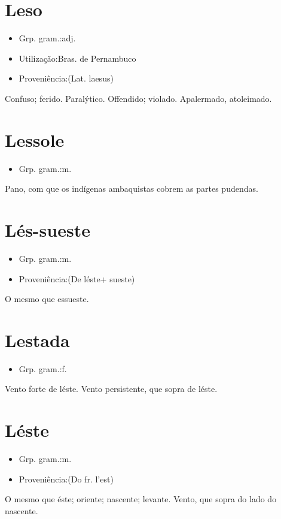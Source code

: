 \section{Leso}
\begin{itemize}
\item {Grp. gram.:adj.}
\end{itemize}
\begin{itemize}
\item {Utilização:Bras. de Pernambuco}
\end{itemize}
\begin{itemize}
\item {Proveniência:(Lat. \textunderscore laesus\textunderscore )}
\end{itemize}
Confuso; ferido.
Paralýtico.
Offendido; violado.
Apalermado, atoleimado.
\section{Lessole}
\begin{itemize}
\item {Grp. gram.:m.}
\end{itemize}
Pano, com que os indígenas ambaquistas cobrem as partes pudendas.
\section{Lés-sueste}
\begin{itemize}
\item {Grp. gram.:m.}
\end{itemize}
\begin{itemize}
\item {Proveniência:(De \textunderscore léste\textunderscore  + \textunderscore sueste\textunderscore )}
\end{itemize}
O mesmo que \textunderscore essueste\textunderscore .
\section{Lestada}
\begin{itemize}
\item {Grp. gram.:f.}
\end{itemize}
Vento forte de léste.
Vento persistente, que sopra de léste.
\section{Léste}
\begin{itemize}
\item {Grp. gram.:m.}
\end{itemize}
\begin{itemize}
\item {Proveniência:(Do fr. \textunderscore l'est\textunderscore )}
\end{itemize}
O mesmo que \textunderscore éste\textunderscore ; oriente; nascente; levante.
Vento, que sopra do lado do nascente.
